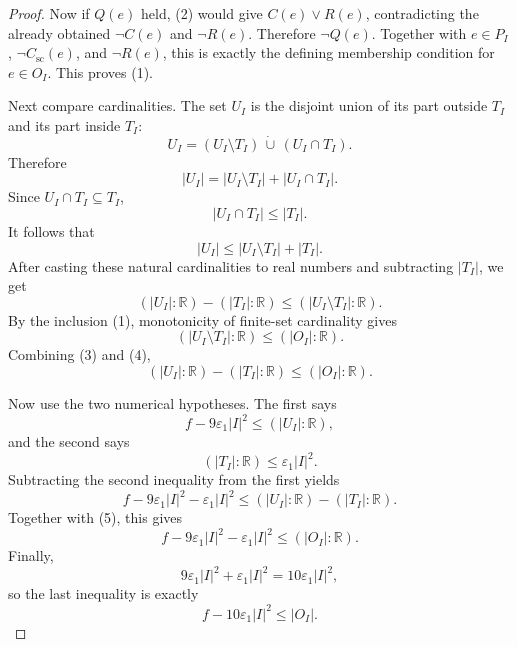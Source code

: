 \begin{proof}
Now if \(Q(e)\) held, (2) would give \(C(e)\vee R(e)\), contradicting the
already obtained \(\neg C(e)\) and \(\neg R(e)\).  Therefore \(\neg Q(e)\).
Together with \(e\in P_I\), \(\neg C_{\mathrm{sc}}(e)\), and \(\neg R(e)\),
this is exactly the defining membership condition for \(e\in O_I\).  This
proves (1).

Next compare cardinalities.  The set \(U_I\) is the disjoint union of its
part outside \(T_I\) and its part inside \(T_I\):
\[
U_I=(U_I\setminus T_I)\,\dot\cup\,(U_I\cap T_I).
\]
Therefore
\[
|U_I|=|U_I\setminus T_I|+|U_I\cap T_I|.
\]
Since \(U_I\cap T_I\subseteq T_I\),
\[
|U_I\cap T_I|\le |T_I|.
\]
It follows that
\[
|U_I|\le |U_I\setminus T_I|+|T_I|.
\]
After casting these natural cardinalities to real numbers and subtracting
\(|T_I|\), we get
\[
(|U_I|:\mathbb R)-(|T_I|:\mathbb R)
\le (|U_I\setminus T_I|:\mathbb R). \tag{3}
\]
By the inclusion (1), monotonicity of finite-set cardinality gives
\[
(|U_I\setminus T_I|:\mathbb R)\le (|O_I|:\mathbb R). \tag{4}
\]
Combining (3) and (4),
\[
(|U_I|:\mathbb R)-(|T_I|:\mathbb R)\le (|O_I|:\mathbb R). \tag{5}
\]

Now use the two numerical hypotheses.  The first says
\[
f-9\varepsilon_1|I|^2\le (|U_I|:\mathbb R),
\]
and the second says
\[
(|T_I|:\mathbb R)\le \varepsilon_1|I|^2.
\]
Subtracting the second inequality from the first yields
\[
f-9\varepsilon_1|I|^2-\varepsilon_1|I|^2
\le (|U_I|:\mathbb R)-(|T_I|:\mathbb R).
\]
Together with (5), this gives
\[
f-9\varepsilon_1|I|^2-\varepsilon_1|I|^2\le (|O_I|:\mathbb R).
\]
Finally,
\[
9\varepsilon_1|I|^2+\varepsilon_1|I|^2
=10\varepsilon_1|I|^2,
\]
so the last inequality is exactly
\[
f-10\varepsilon_1|I|^2\le |O_I|.
\]
\end{proof}
